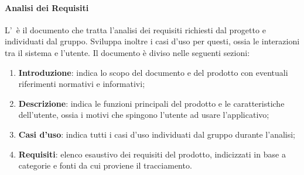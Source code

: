 \paragraph{Analisi dei Requisiti}
L'\AdR\ è il documento che tratta l'analisi dei requisiti richiesti dal progetto e individuati dal gruppo. Sviluppa inoltre i casi d'uso per questi, ossia le interazioni tra il sistema e l'utente.
Il documento è diviso nelle seguenti sezioni:
\begin{enumerate}
  \item \textbf{Introduzione}: indica lo scopo del documento e del prodotto con eventuali riferimenti normativi e informativi;
  \item \textbf{Descrizione}: indica le funzioni principali del prodotto e le caratteristiche dell'utente, ossia i motivi che spingono l'utente ad usare l'applicativo;
  \item \textbf{Casi d'uso}: indica tutti i casi d'uso individuati dal gruppo durante l'analisi;
  \item \textbf{Requisiti}: elenco esaustivo dei requisiti del prodotto, indicizzati in base a categorie e fonti da cui proviene il tracciamento.
\end{enumerate}

